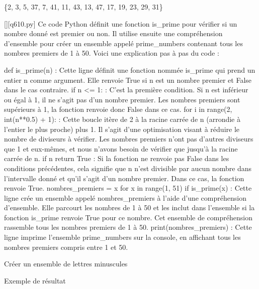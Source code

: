 \{2, 3, 5, 37, 7, 41, 11, 43, 13, 47, 17, 19, 23, 29, 31\}
        \par
        \begin{solution}
            \renewcommand{\nomfichier}{q610.py}
            \pythonfile{\chemincode \nomfichier}[][\nomfichier]
            Ce code Python définit une fonction is_prime pour vérifier si un nombre donné est premier ou non. Il utilise ensuite une compréhension d'ensemble pour créer un ensemble appelé prime_numbers contenant tous les nombres premiers de 1 à 50. Voici une explication pas à pas du code :

    def is_prime(n) : Cette ligne définit une fonction nommée is_prime qui prend un entier n comme argument. Elle renvoie True si n est un nombre premier et False dans le cas contraire.
    if n <= 1: : C'est la première condition. Si n est inférieur ou égal à 1, il ne s'agit pas d'un nombre premier. Les nombres premiers sont supérieurs à 1, la fonction renvoie donc False dans ce cas.
    for i in range(2, int(n**0.5) + 1): : Cette boucle itère de 2 à la racine carrée de n (arrondie à l'entier le plus proche) plus 1. Il s'agit d'une optimisation visant à réduire le nombre de diviseurs à vérifier. Les nombres premiers n'ont pas d'autres diviseurs que 1 et eux-mêmes, et nous n'avons besoin de vérifier que jusqu'à la racine carrée de n.
    if n %
    return True : Si la fonction ne renvoie pas False dans les conditions précédentes, cela signifie que n n'est divisible par aucun nombre dans l'intervalle donné et qu'il s'agit d'un nombre premier. Dans ce cas, la fonction renvoie True.
    nombres_premiers = {x for x in range(1, 51) if is_prime(x)} : Cette ligne crée un ensemble appelé nombres_premiers à l'aide d'une compréhension d'ensemble. Elle parcourt les nombres de 1 à 50 et les inclut dans l'ensemble si la fonction is_prime renvoie True pour ce nombre. Cet ensemble de compréhension rassemble tous les nombres premiers de 1 à 50.
    print(nombres_premiers) : Cette ligne imprime l'ensemble prime_numbers sur la console, en affichant tous les nombres premiers compris entre 1 et 50.
        \end{solution}
        

        \question
        Créer un ensemble de lettres minuscules

Exemple de résultat

